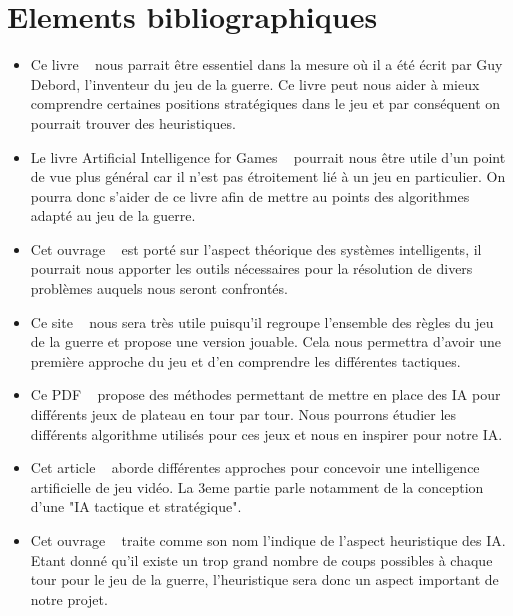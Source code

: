 \documentclass[12pt]{article}
\begin{document}
\section{Elements bibliographiques}
\begin{itemize}
\item Ce livre ~\cite{ref1} nous parrait être essentiel dans la mesure où il a été écrit par Guy Debord, l'inventeur du jeu de la guerre. Ce livre peut nous aider à mieux comprendre certaines positions stratégiques dans le jeu et par conséquent on pourrait trouver des heuristiques. 
\\[1\baselineskip]

\item Le livre Artificial Intelligence for Games ~\cite{ref2} pourrait nous être utile d'un point de vue plus général car il n'est pas étroitement lié à un jeu en particulier. On pourra donc s'aider de ce livre afin de mettre au points des algorithmes adapté au jeu de la guerre.\\[1\baselineskip]

\item Cet ouvrage ~\cite{ref3} est porté sur l'aspect théorique des systèmes intelligents, il pourrait nous apporter les outils nécessaires pour la résolution de divers problèmes auquels nous seront confrontés.\\[1\baselineskip]

\item Ce site ~\cite{ref4} nous sera très utile puisqu'il regroupe l'ensemble des règles du jeu de la guerre et propose une version jouable. Cela nous permettra d'avoir une première approche du jeu et d'en comprendre les différentes tactiques.\\[1\baselineskip]

\item Ce PDF ~\cite{ref5} propose des méthodes permettant de mettre en place des IA pour différents jeux de plateau en tour par tour. Nous pourrons étudier les différents algorithme utilisés pour ces jeux et nous en inspirer pour notre IA.\\[1\baselineskip]

\item Cet article ~\cite{ref6} aborde différentes approches pour concevoir une intelligence artificielle de jeu vidéo. La 3eme partie parle notamment de la conception d'une "IA tactique et stratégique".\\[1\baselineskip]

\item Cet ouvrage ~\cite{ref7} traite comme son nom l'indique de l'aspect heuristique des IA. Etant donné qu'il existe un trop grand nombre de coups possibles à chaque tour pour le jeu de la guerre, l'heuristique sera donc un aspect important de notre projet.\\[1\baselineskip]


\end{itemize}
\end{document}
